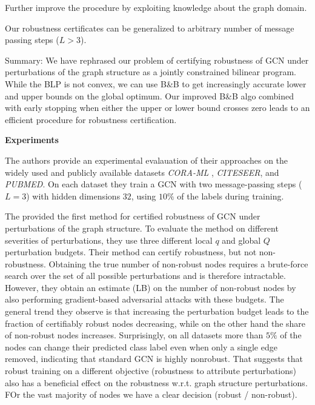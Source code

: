 \documentclass[a4paper,preprint]{sig-alternate}
\begin{document}
Further improve the procedure by exploiting knowledge about the graph domain.\newline

Our robustness certificates can be generalized to arbitrary number of message passing steps ($L>3$).

Summary: We have rephrased our problem of certifying robustness of GCN under perturbations of the graph structure
as a jointly constrained bilinear program. While the BLP is not convex, we can use B\&B to get increasingly accurate
lower and upper bounds on the global optimum. Our improved B\&B algo combined with early stopping when either the upper or
lower bound crosses zero leads to an efficient procedure for robustness certification.\newline

\textbf{Experiments}

The authors provide an experimental evalauation of their approaches on the widely used and publicly available datasets \textit{CORA-ML}
, \textit{CITESEER}, and \textit{PUBMED}. On each dataset they train a GCN with two message-passing steps ($L=3$) with hidden dimensions $32$,
using $10 \%$ of the labels during training.\newline

The provided the first method for certified robustness of GCN under perturbations of the graph structure. To evaluate the method on different
severities of perturbations, they use three different local $q$ and global $Q$ perturbation budgets. Their method can certify robustness,
but not non-robustness. Obtaining the true number of non-robust nodes requires a brute-force search over the set of all possible perturbations
and is therefore intractable. However, they obtain an estimate (LB) on the number of non-robust nodes by also performing gradient-based 
adversarial attacks with these budgets. The general trend they observe is that increasing the perturbation budget leads to the fraction of certifiably
robust nodes decreasing, while on the other hand the share of non-robust nodes increases. Surprisingly, on all datasets more than $5\%$ of the nodes can change 
their predicted class label even when only a single edge removed, indicating that standard GCN is highly nonrobust. That suggests that robust training on
a different objective (robustness to attribute perturbations) also has a beneficial effect on the robustness w.r.t. graph structure perturbations.
FOr the vast majority of nodes we have a clear decision (robust / non-robust).\newline
\end{document}
